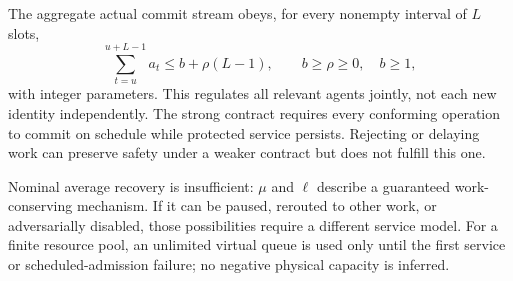 \documentclass[11pt,a4paper]{article}
\theoremstyle{definition}\newtheorem{definition}{Definition}
\begin{document}
The aggregate actual commit stream obeys, for every nonempty interval of $L$ slots,
\begin{equation}
\sum_{t=u}^{u+L-1}a_t\le b+\rho(L-1),\qquad b\ge\rho\ge0,\quad b\ge1,
\label{eq:envelope}
\end{equation}
with integer parameters. This regulates all relevant agents jointly, not each new identity independently. The strong contract requires every conforming operation to commit on schedule while protected service persists. Rejecting or delaying work can preserve safety under a weaker contract but does not fulfill this one.

Nominal average recovery is insufficient: $\mu$ and $\ell$ describe a guaranteed work-conserving mechanism. If it can be paused, rerouted to other work, or adversarially disabled, those possibilities require a different service model. For a finite resource pool, an unlimited virtual queue is used only until the first service or scheduled-admission failure; no negative physical capacity is inferred.
\end{document}
